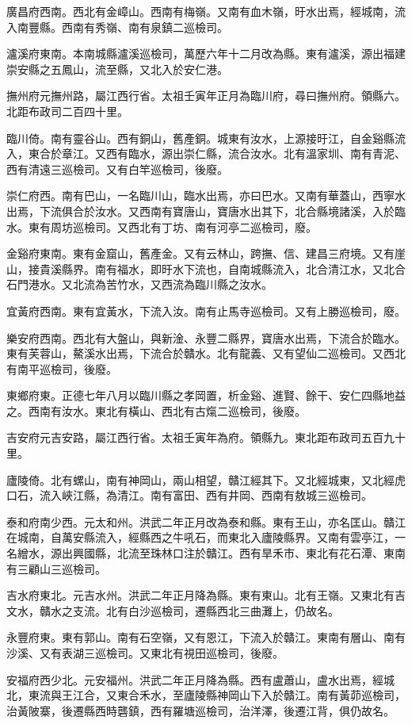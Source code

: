 廣昌府西南。西北有金嶂山。西南有梅嶺。又南有血木嶺，旴水出焉，經城南，流入南豐縣。西南有秀嶺、南有泉鎮二巡檢司。

瀘溪府東南。本南城縣瀘溪巡檢司，萬歷六年十二月改為縣。東有瀘溪，源出福建崇安縣之五鳳山，流至縣，又北入於安仁港。

撫州府元撫州路，屬江西行省。太祖壬寅年正月為臨川府，尋曰撫州府。領縣六。北距布政司二百四十里。

臨川倚。南有靈谷山。西有銅山，舊產銅。城東有汝水，上源接旴江，自金谿縣流入，東合於章江。又西有臨水，源出崇仁縣，流合汝水。北有溫家圳、南有青泥、西有清遠三巡檢司。又有白竿巡檢司，後廢。

崇仁府西。南有巴山，一名臨川山，臨水出焉，亦曰巴水。又南有華蓋山，西寧水出焉，下流俱合於汝水。又西南有寶唐山，寶唐水出其下，北合縣境諸溪，入於臨水。東有周坊巡檢司。又西北有丁坊、南有河亭二巡檢司，廢。

金谿府東南。東有金窟山，舊產金。又有云林山，跨撫、信、建昌三府境。又有崖山，接貴溪縣界。南有福水，即旴水下流也，自南城縣流入，北合清江水，又北合石門港水。又北流為苦竹水，又西流為臨川縣之汝水。

宜黃府西南。東有宜黃水，下流入汝。南有止馬寺巡檢司。又有上勝巡檢司，廢。

樂安府西南。西北有大盤山，與新淦、永豐二縣界，寶唐水出焉，下流合於臨水。東有芙蓉山，鰲溪水出焉，下流合於贛水。北有龍義、又有望仙二巡檢司。又西北有南平巡檢司，後廢。

東鄉府東。正德七年八月以臨川縣之孝岡置，析金谿、進賢、餘干、安仁四縣地益之。西南有汝水。東北有橫山、西北有古熂二巡檢司，後廢。

吉安府元吉安路，屬江西行省。太祖壬寅年為府。領縣九。東北距布政司五百九十里。

廬陵倚。北有螺山，南有神岡山，兩山相望，贛江經其下。又北經城東，又北經虎口石，流入峽江縣，為清江。南有富田、西有井岡、西南有敖城三巡檢司。

泰和府南少西。元太和州。洪武二年正月改為泰和縣。東有王山，亦名匡山。贛江在城南，自萬安縣流入，經縣西之牛吼石，而東北入廬陵縣界。又南有雲亭江，一名繒水，源出興國縣，北流至珠林口注於贛江。西有旱禾市、東北有花石潭、東南有三顧山三巡檢司。

吉水府東北。元吉水州。洪武二年正月降為縣。東有東山。北有王嶺。又東北有吉文水，贛水之支流。北有白沙巡檢司，遷縣西北三曲灘上，仍故名。

永豐府東。東有郭山。南有石空嶺，又有恩江，下流入於贛江。東南有層山、南有沙溪、又有表湖三巡檢司。又東北有視田巡檢司，後廢。

安福府西少北。元安福州。洪武二年正月降為縣。西有盧蕭山，盧水出焉，經城北，東流與王江合，又東合禾水，至廬陵縣神岡山下入於贛江。南有黃茆巡檢司，治黃陂寨，後遷縣西時礱鎮，西有羅塘巡檢司，治洋澤，後遷江背，俱仍故名。

